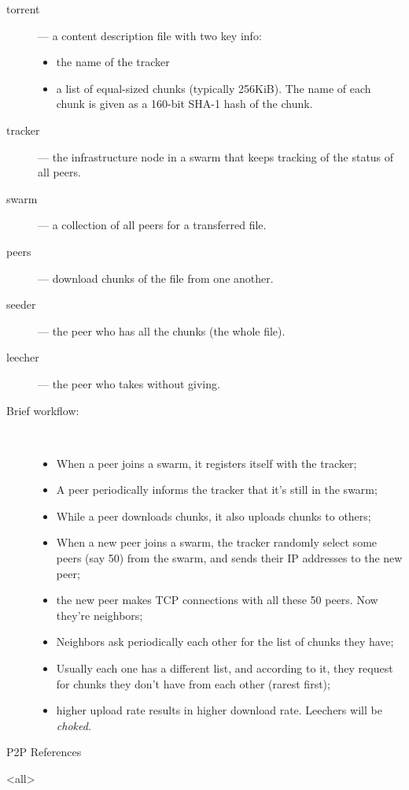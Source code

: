 \begin{description}
\item[torrent] --- a content description file with two key info:
  \begin{itemize}
  \item the name of the tracker
  \item a list of equal-sized chunks (typically 256KiB). The name of each chunk is given
    as a 160-bit SHA-1 hash of the chunk.
  \end{itemize}
\item[tracker] --- the infrastructure node in a swarm that keeps tracking of the status of
  all peers.
\item[swarm] --- a collection of all peers for a transferred file.
\item[peers] --- download chunks of the file from one another.
\item[seeder] --- the peer who has all the chunks (the whole file).
\item[leecher] --- the peer who takes without giving.
\item[Brief workflow:] \,
  \begin{itemize}
  \item When a peer joins a swarm, it registers itself with the tracker;
  \item A peer periodically informs the tracker that it's still in the swarm;
  \item While a peer downloads chunks, it also uploads chunks to others;
  \item When a new peer joins a swarm, the tracker randomly select some peers (say 50)
    from the swarm, and sends their IP addresses to the new peer;
  \item the new peer makes TCP connections with all these 50 peers. Now they're neighbors;
  \item Neighbors ask periodically each other for the list of chunks they have;
  \item Usually each one has a different list, and according to it, they request for
    chunks they don't have from each other (rarest first);
  \item higher upload rate results in higher download rate. Leechers will be
    \emph{choked}.
  \end{itemize}
\end{description}



\begin{frame}{P2P References}
  \begin{refsection}
    \nocite{wiki:bt,cohen08specification}
    \printbibliography[heading=none]
  \end{refsection}
\end{frame}

\mode<all>
